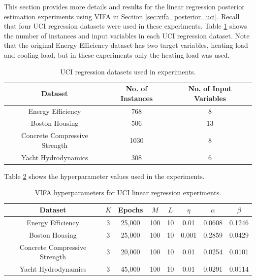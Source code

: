 \documentclass[msc,deptreport.inf]{infthesis} %
\begin{document}
This section provides more details and results for the linear regression posterior estimation experiments using VIFA in Section \ref{sec:vifa_posterior_uci}. Recall that four UCI regression datasets were used in these experiments. Table \ref{table:uci_datasets} shows the number of instances and input variables in each UCI regression dataset. Note that the original Energy Efficiency dataset has two target variables, heating load and cooling load, but in these experiments only the heating load was used. 
\begin{table}[h!]
	\begin{center}
		\begin{tabular}{||c c c ||} 
			\hline
 			Dataset & No. of Instances & No. of Input Variables \\ [0.5ex] 
			\hline\hline
			Energy Efficiency 				& 768 	& 8 \\
 			\hline
 			Boston Housing 				& 506 	& 13 \\ 
 			\hline
 			Concrete Compressive Strength 	& 1030 	& 8 \\
 			\hline
 			Yacht Hydrodynamics 			& 308 	& 6 \\ [1ex] 
 			\hline
		\end{tabular}
		\caption{UCI regression datasets used in experiments.}
		\label{table:uci_datasets}
	\end{center}
\end{table}

Table \ref{table:vifa_uci_hyperparameters} shows the hyperparameter values used in the experiments.
\begin{table}[h!]
	\begin{center}
		\begin{tabular}{||c c c c c c c c||} 
			\hline
 			Dataset & $K$ & Epochs & $M$ & $L$ & $\eta$ & $\alpha$ & $\beta$ \\ [0.5ex] 
			\hline\hline
			Energy Efficiency 				& 3 & 25,000 & 100 & 10 	& 0.01 	& 0.0608 & 0.1246 \\ 
 			\hline
			Boston Housing 				& 3 & 25,000 & 100 & 10 	& 0.001 	& 0.2859 & 0.0429 \\
 			\hline
 			Concrete Compressive Strength	& 3 & 20,000 & 100 & 10 	& 0.01 	& 0.0254 & 0.0101 \\
 			\hline
 			Yacht Hydrodynamics 			& 3 & 45,000 & 100 & 10 	& 0.01 	& 0.0291 & 0.0114 \\ [1ex] 
 			\hline
		\end{tabular}
		\caption{VIFA hyperparameters for UCI linear regression experiments.}
		\label{table:vifa_uci_hyperparameters}
	\end{center}
\end{table}
\end{document}
